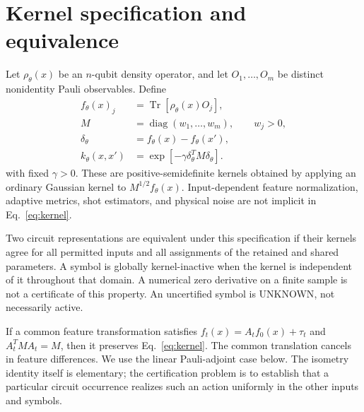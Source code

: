\documentclass[a4paper,twocolumn,11pt,unpublished]{quantumarticle}
\newcommand{\Tr}{\operatorname{Tr}}
\newcommand{\unknown}{\textnormal{UNKNOWN}}
\newcommand{\diag}{\operatorname{diag}}
\begin{document}
\section{Kernel specification and equivalence}
Let $\rho_\theta(x)$ be an $n$-qubit density operator, and let
$O_1,\ldots,O_m$ be distinct nonidentity Pauli observables. Define
\begin{align}
 f_\theta(x)_j&=\Tr[\rho_\theta(x)O_j],\\
 M&=\diag(w_1,\ldots,w_m),\qquad w_j>0,\\
 \delta_\theta&=f_\theta(x)-f_\theta(x'),\nonumber\\
 k_\theta(x,x')&=\exp[-\gamma\delta_\theta^T M\delta_\theta].\label{eq:kernel}
\end{align}
with fixed $\gamma>0$. These are positive-semidefinite kernels obtained
by applying an ordinary Gaussian kernel to $M^{1/2}f_\theta(x)$.
Input-dependent feature normalization, adaptive metrics, shot estimators,
and physical noise are not implicit in Eq.~\eqref{eq:kernel}.

Two circuit representations are equivalent under this specification
if their kernels agree for all permitted inputs and all assignments
of the retained and shared parameters. A symbol is globally
kernel-inactive when the kernel is independent of it throughout that
domain. A numerical zero derivative on a finite sample is not a
certificate of this property. An uncertified symbol is \unknown,
not necessarily active.

If a common feature transformation satisfies
$f_t(x)=A_t f_0(x)+\tau_t$ and $A_t^T M A_t=M$, then it preserves
Eq.~\eqref{eq:kernel}. The common translation cancels in feature
differences. We use the linear Pauli-adjoint case below. The isometry
identity itself is elementary; the certification problem is to establish
that a particular circuit occurrence realizes such an action uniformly
in the other inputs and symbols.


\end{document}
